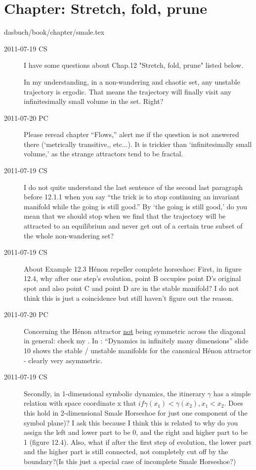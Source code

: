 \section{Chapter: Stretch, fold, prune}
\label{c-smale}\noindent dasbuch/book/chapter/smale.tex
\begin{description}

\item[2011-07-19 CS]
I have some questions about Chap.12 "Stretch, fold, prune" listed below.

In my understanding, in a non-wandering and chaotic set, any unstable
trajectory is ergodic. That means the trajectory will finally visit any
infinitesimally small volume in the set. Right?

\item[2011-07-20 PC]                                        \toCB
Please reread chapter ``Flows,'' alert me if the question is not answered
there (`metrically transitive,, etc...). It is trickier than
`infinitesimally small volume,' as the strange attractors tend to be
fractal.

\item[2011-07-19 CS]
I do not quite understand the last sentence of the second last paragraph
before 12.1.1 when you say ``the trick is to stop continuing an invariant
manifold while the going is still good.'' By `the going is still good,' do
you mean that we should stop when we find that the trajectory will be
attracted to an equilibrium and never get out of a certain true subset of
the whole non-wandering set?

\item[2011-07-19 CS]
About Example 12.3 H\'enon repeller complete horseshoe:
First, in figure 12.4, why after one step's evolution, point B occupies
point D's original spot and also point C and point D are in the stable
manifold? I do not think this is just a coincidence but still haven't
figure out the reason.

\item[2011-07-20 PC]                                        \toCB
Concerning the H\'enon attractor \underline{not} being symmetric across
the diagonal in general: check my
.
In : ``Dynamics in infinitely many dimensions'' slide 10 shows the
stable / unstable manifolds for the canonical H\'enon attractor - clearly
very asymmetric.

\item[2011-07-19 CS]
Secondly, in 1-dimensional symbolic dynamics, the itinerary $\gamma$ has a
simple relation with space coordinate x that $if \gamma(x_1) <
\gamma(x_2), x_1<x_2$. Does this hold in 2-dimensional Smale Horseshoe
for just one component of the symbol plane)? I ask this because I think
this is related to why do you assign the left and lower part to be 0, and
the right and higher part to be 1 (figure 12.4). Also, what if after the
first step of evolution, the lower part and the higher part is still
connected, not completely cut off by the boundary?(Is this just a special
case of incomplete Smale Horseshoe?)


\end{description}
